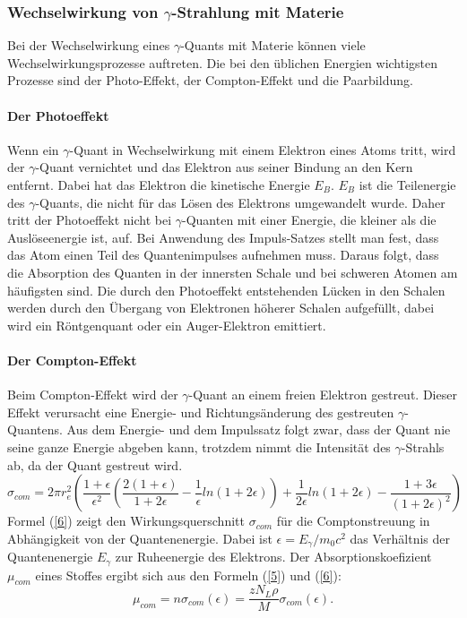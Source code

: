 \documentclass[11pt,ngerman,a4paper]{article}
\begin{document}
\subsubsection{Wechselwirkung von $\gamma$-Strahlung mit Materie}
Bei der Wechselwirkung eines $\gamma$-Quants mit Materie können viele Wechselwirkungsprozesse auftreten. Die bei den üblichen Energien wichtigsten Prozesse sind der Photo-Effekt, der Compton-Effekt und die Paarbildung.
\paragraph{Der Photoeffekt}
Wenn ein $\gamma$-Quant in Wechselwirkung mit einem Elektron eines Atoms tritt, wird der $\gamma$-Quant vernichtet und das Elektron aus seiner Bindung an den Kern entfernt. Dabei hat das Elektron die kinetische Energie $E_B$. $E_B$ ist die Teilenergie des $\gamma$-Quants, die nicht für das Lösen des Elektrons umgewandelt wurde. Daher tritt der Photoeffekt nicht bei $\gamma$-Quanten mit einer Energie, die kleiner als die Auslöseenergie ist, auf. Bei Anwendung des Impuls-Satzes stellt man fest, dass das Atom einen Teil des Quantenimpulses aufnehmen muss. Daraus folgt, dass die Absorption des Quanten in der innersten Schale und bei schweren Atomen am häufigsten sind. Die durch den Photoeffekt entstehenden Lücken in den Schalen werden durch den Übergang von Elektronen höherer Schalen aufgefüllt, dabei wird ein Röntgenquant oder ein Auger-Elektron emittiert.
\paragraph{Der Compton-Effekt}
Beim Compton-Effekt wird der $\gamma$-Quant an einem freien Elektron gestreut. Dieser Effekt verursacht eine Energie- und Richtungsänderung des gestreuten $\gamma$-Quantens. Aus dem Energie- und dem Impulssatz folgt zwar, dass der Quant nie seine ganze Energie abgeben kann, trotzdem nimmt die Intensität des $\gamma$-Strahls ab, da der Quant gestreut wird.
\begin{equation}
\sigma_{com} = 2\pi r_e^2\left(\frac{1+\epsilon}{\epsilon^2} \left( \frac{2(1+\epsilon)}{1+2\epsilon}-\frac{1}{\epsilon}ln(1+2\epsilon) \right) + \frac{1}{2\epsilon}ln(1+2\epsilon) - \frac{1+3\epsilon}{(1+2\epsilon)^2} \right)
\label{6}
\end{equation}
Formel (\ref{6}) zeigt den Wirkungsquerschnitt $\sigma_{com}$ für die Comptonstreuung in Abhängigkeit von der Quantenenergie. Dabei ist $\epsilon = E_{\gamma} / m_0c^2$ das Verhältnis der Quantenenergie $E_{\gamma}$ zur Ruheenergie des Elektrons. Der Absorptionskoefizient  $\mu_{com}$ eines Stoffes ergibt sich aus den Formeln (\ref{5}) und (\ref{6}):
\begin{equation}
\mu_{com} = n\sigma_{com}(\epsilon) = \frac{zN_L\rho}{M}\sigma_{com}(\epsilon).
\label{7}
\end{equation}
\end{document}
